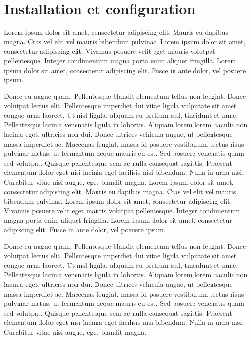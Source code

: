 \chapter{Installation et configuration}
Lorem ipsum dolor sit amet, consectetur adipiscing elit. Mauris eu dapibus magna. Cras vel elit vel mauris bibendum pulvinar. Lorem ipsum dolor sit amet, consectetur adipiscing elit. Vivamus posuere velit eget mauris volutpat pellentesque. Integer condimentum magna porta enim aliquet fringilla. Lorem ipsum dolor sit amet, consectetur adipiscing elit. Fusce in ante dolor, vel posuere ipsum.

Donec eu augue quam. Pellentesque blandit elementum tellus non feugiat. Donec volutpat lectus elit. Pellentesque imperdiet dui vitae ligula vulputate sit amet congue urna laoreet. Ut nisl ligula, aliquam eu pretium sed, tincidunt et nunc. Pellentesque lacinia venenatis ligula in lobortis. Aliquam lorem lorem, iaculis non lacinia eget, ultricies non dui. Donec ultrices vehicula augue, ut pellentesque massa imperdiet ac. Maecenas feugiat, massa id posuere vestibulum, lectus risus pulvinar metus, ut fermentum neque mauris eu est. Sed posuere venenatis quam sed volutpat. Quisque pellentesque sem ac nulla consequat sagittis. Praesent elementum dolor eget nisi lacinia eget facilisis nisi bibendum. Nulla in urna nisi. Curabitur vitae nisl augue, eget blandit magna. 
Lorem ipsum dolor sit amet, consectetur adipiscing elit. Mauris eu dapibus magna. Cras vel elit vel mauris bibendum pulvinar. Lorem ipsum dolor sit amet, consectetur adipiscing elit. Vivamus posuere velit eget mauris volutpat pellentesque. Integer condimentum magna porta enim aliquet fringilla. Lorem ipsum dolor sit amet, consectetur adipiscing elit. Fusce in ante dolor, vel posuere ipsum.

Donec eu augue quam. Pellentesque blandit elementum tellus non feugiat. Donec volutpat lectus elit. Pellentesque imperdiet dui vitae ligula vulputate sit amet congue urna laoreet. Ut nisl ligula, aliquam eu pretium sed, tincidunt et nunc. Pellentesque lacinia venenatis ligula in lobortis. Aliquam lorem lorem, iaculis non lacinia eget, ultricies non dui. Donec ultrices vehicula augue, ut pellentesque massa imperdiet ac. Maecenas feugiat, massa id posuere vestibulum, lectus risus pulvinar metus, ut fermentum neque mauris eu est. Sed posuere venenatis quam sed volutpat. Quisque pellentesque sem ac nulla consequat sagittis. Praesent elementum dolor eget nisi lacinia eget facilisis nisi bibendum. Nulla in urna nisi. Curabitur vitae nisl augue, eget blandit magna. 







